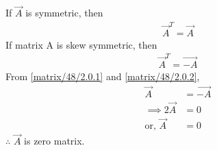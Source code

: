 If $\vec{A}$ is symmetric, then 
\begin{align}
\vec{A}^T =\vec{A}
\label{matrix/48/2.0.1}
\end{align}
If matrix A is skew symmetric, then
\begin{align}
\vec{A}^T = \vec{-A}
\label{matrix/48/2.0.2}
\end{align}
From  \eqref{matrix/48/2.0.1} and \eqref{matrix/48/2.0.2},
\begin{align}
\vec{A} &=\vec{-A}
\\
\implies 2\vec{A} &= 0
\\
\text{or, } \vec{A} &= 0
\end{align}
$\therefore $ $\vec{A}$ is zero matrix.